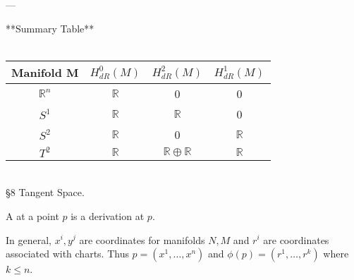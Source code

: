 \documentclass[10pt,a4paper]{report}
\begin{document}
 ---

 **Summary Table**\\ \\
 \begin{tabular}{|c|c|c|c|}
 \hline
  Manifold M & $H^0_{dR}(M)$ & $H^2_{dR}(M)$& $H^1_{dR}(M)$ \\
 \hline
  \( \mathbb{R}^n \) & \( \mathbb{R} \) & 0 & 0 \\
 \hline
 \( S^1 \) & \( \mathbb{R} \) & \( \mathbb{R} \) & 0 \\
 \hline
  \( S^2 \) & \( \mathbb{R} \) & 0 & \( \mathbb{R} \) \\
 \hline
 \( T^2 \) & \( \mathbb{R} \) & \( \mathbb{R} \oplus \mathbb{R} \) & \( \mathbb{R} \)\\
 \hline
 \end{tabular}\\
 
 \newpage
 \Large{\S 8 Tangent Space.}
 
 \setcounter{chapter}{8}
 \setcounter{section}{1}
 
 \begin{definition}  A  at a point $p$ is a derivation at $p$.
 \end{definition}
 
 \begin{remark}
 
 In general, $x^i, y^j$ are coordinates for manifolds $N,M$ and $r^i$ are coordinates associated with charts.  Thus $p=(x^1, \dots, x^n)$ and $\phi(p)=(r^1, \dots, r^k)$ where $k \le n$.
 \end{remark}
 
\end{document}
